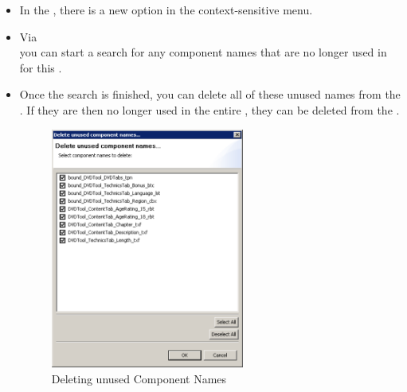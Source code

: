 \begin{itemize}
\item In the \gdomeditor{}, there is a new option in the context-sensitive menu. 
\item Via  \\
you can start a search for any component names that are no longer used in \gdsuites{} for this \gdaut{}. 
\item Once the search is finished, you can delete all of these unused names from the \gdomeditor{}. If they are then no longer used in the entire \gdproject{}, 
they can be deleted from the \gdcompnamebrowser{}. 

\begin{figure}[h]
\begin{center}
\includegraphics[width=0.60\textwidth]{52/ps/DeleteUnusedCompNames}
\caption{Deleting unused Component Names}
\label{RNDeleteUnusedCN}
\end{center}
\end{figure}
		
\end{itemize}

